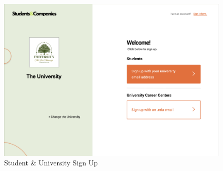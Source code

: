 \documentclass[a4paper,12pt]{article}
\begin{document}
\begin{figure}[H]
    \centering
    \includegraphics[scale = 0.45]{figures/UserInterfaces/General/SUSignUp.png}
    \caption{Student \& University Sign Up}
    \centering
\end{figure}
\end{document}
